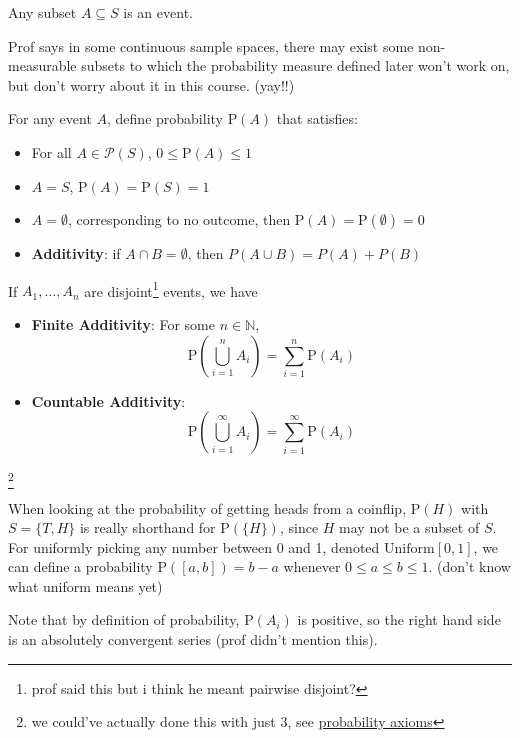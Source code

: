 \begin{definition}[Event]
Any subset $A \subseteq S$ is an event. 
\end{definition}
Prof says in some continuous sample spaces, there may exist some non-measurable subsets to which the probability measure defined later won't work on, but don't worry about it in this course. (yay!!)
\begin{definition}[Probability]
    For any event $A$, define probability $\mathrm{P}(A)$ that satisfies:
    \begin{itemize}
        \item For all $A \in \mathcal{P}(S)$, $0 \leq \mathrm{P}(A) \leq 1$
        \item $A = S$, $\mathrm{P}(A) = \mathrm{P}(S) = 1$
        \item $A = \emptyset$, corresponding to no outcome, then $\mathrm{P}(A) = \mathrm{P}(\emptyset) = 0$
        \item \textbf{Additivity}: if $A \cap B = \emptyset$, then $P(A \cup B) = P(A) + P(B)$
    \end{itemize}
    If $A_1, \dots, A_n$ are disjoint\footnote{prof said this but i think he meant pairwise disjoint?} events, we have
    \begin{itemize}
        \item \textbf{Finite Additivity}: For some $n \in \mathbb{N}$,
\[
\mathrm{P}\left(\bigcup_{i = 1}^n A_i\right) = \sum_{i=1}^n \mathrm{P}(A_i)
\]
        \item \textbf{Countable Additivity}:
\[
\mathrm{P}\left(\bigcup_{i=1}^\infty A_i\right) = \sum_{i=1}^\infty \mathrm{P}(A_i)
\]
    \end{itemize}

\end{definition}\footnote{we could've actually done this with just 3, see \href{https://en.wikipedia.org/wiki/Probability_axioms}{probability axioms}}

When looking at the probability of getting heads from a coinflip, $\mathrm{P}(H)$ with $S = \{T, H\}$ is really shorthand for $\mathrm{P}(\{ H \})$, since $H$ may not be a subset of $S$. For uniformly picking any number between 0 and 1, denoted $\mathrm{Uniform}[0, 1]$, we can define a probability $\mathrm{P}([a, b]) = b - a$ whenever $0 \leq a \leq b \leq 1$. (don't know what uniform means yet)

Note that by definition of probability, $\mathrm{P}(A_i)$ is positive, so the right hand side is an absolutely convergent series (prof didn't mention this).
